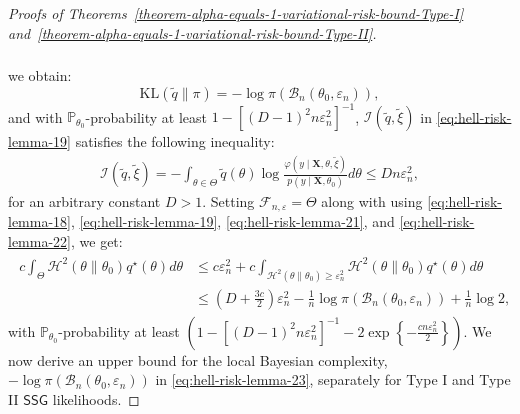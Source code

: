 \documentclass[12pt]{article}
\numberwithin{equation}{section}
\newcommand{\ssg}{\mathsf{SSG}}
\begin{document}
\begin{proof}[Proofs of Theorems~\ref{theorem-alpha-equals-1-variational-risk-bound-Type-I} and~\ref{theorem-alpha-equals-1-variational-risk-bound-Type-II}]
\begin{align}
\begin{split}
    \end{split}
\end{align}
%
we obtain:
%
\begin{equation}\label{eq:hell-risk-lemma-21}
\mathrm{KL}(\tilde{q}\parallel\pi) = - \log \pi(\mathcal{B}_n(\theta_0, \varepsilon_n)),
\end{equation}
%
and with $\mathbb{P}_{\theta_0}$-probability at least $1 - [(D-1)^2n\varepsilon_n^2]^{-1}$, $\mathcal{I}(\tilde{q} , \tilde{\xi})$ in \eqref{eq:hell-risk-lemma-19} 
satisfies the following inequality:
%
\begin{align}\label{eq:hell-risk-lemma-22}
    \mathcal{I}(\tilde{q} , \tilde{\xi}) = -\int_{\theta\in \Theta}\tilde{q}(\theta)\log\frac{\varphi(y\mid \mathbf{X}, \theta, \tilde{\xi})}{p(y\mid \mathbf{X}, \theta_0)}d\theta \leq Dn\varepsilon_n^2,
\end{align}
for an arbitrary constant $D>1$.
%
Setting $\mathcal{F}_{n, \varepsilon} = \Theta$ along with using \eqref{eq:hell-risk-lemma-18}, \eqref{eq:hell-risk-lemma-19}, \eqref{eq:hell-risk-lemma-21}, and \eqref{eq:hell-risk-lemma-22}, we get:
\begin{align}\label{eq:hell-risk-lemma-23}
\begin{split}
    c\int_{\Theta}\mathcal{H}^{2}(\theta \parallel \theta_0) q^{\star}(\theta)d\theta &\leq c\varepsilon_n^2 + c\int_{\mathcal{H}^{2}(\theta\parallel \theta_0) \geq \varepsilon_n^2}\mathcal{H}^{2}(\theta\parallel \theta_0)q^{\star}(\theta)d\theta\\
    &\leq \left(D + \frac{3c}{2}\right)\varepsilon_n^{2} - \frac{1}{n}\log \pi(\mathcal{B}_n(\theta_0, \varepsilon_n)) + \frac{1}{n}\log 2,
\end{split}
\end{align}
with $\mathbb{P}_{\theta_0}$-probability at least $\left(1 - [(D-1)^2n\varepsilon_n^2]^{-1} - 2\exp\left\{-\tfrac{c n \varepsilon_n^2}{2}\right\}\right)$. 
%
We now derive an upper bound for the local Bayesian complexity, $-\log \pi(\mathcal{B}_n(\theta_0, \varepsilon_n))$ in \eqref{eq:hell-risk-lemma-23}, separately for Type I and Type II $\ssg$ likelihoods.


\end{proof}
\end{document}
